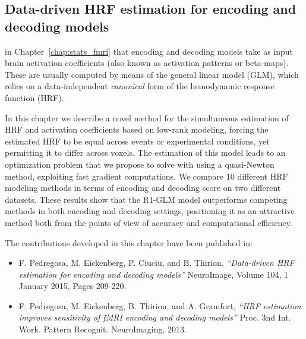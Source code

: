 \begin{fullwidth}
\chapter{Data-driven HRF estimation for encoding and \\ \mbox{decoding} models}\label{chap:hrf_estimation}
\end{fullwidth}


 in Chapter~\ref{chap:stats_fmri} that encoding and decoding models take as input  brain activation coefficients (also known as activation patterns or beta-maps). These are usually computed by means of the general linear model (GLM), which
relies on a \mbox{data-independent} \emph{canonical} form of the hemodynamic response function
(HRF).


In this chapter we describe a novel method for the simultaneous estimation of HRF and activation coefficients based on low-rank modeling, forcing the estimated HRF to be equal across events or experimental conditions,
 yet permitting it to differ across voxels. The estimation of this model leads to
an optimization problem that we propose to solve with using a
\mbox{quasi-Newton} method, exploiting fast gradient computations. 
We compare 10 different HRF modeling methods in terms of encoding and decoding
score on two different datasets. These results show that the \mbox{R1-GLM} model
outperforms competing methods in both encoding and decoding
settings, positioning it as an attractive method both from the points of view
of accuracy and computational efficiency.

\hspace{20pt}
\begin{shaded}
The contributions developed in this chapter have been published in:
\begin{itemize}
\item F. Pedregosa, M. Eickenberg, P. Ciuciu, and B. Thirion, \emph{``Data-driven HRF estimation for encoding and decoding models''} NeuroImage, Volume 104, 1 January 2015, Pages 209-220.

\item F. Pedregosa, M. Eickenberg, B. Thirion, and A. Gramfort, \emph{“HRF estimation improves sensitivity of fMRI encoding and decoding models”} Proc. 3nd Int. Work. Pattern Recognit. NeuroImaging, 2013.
\end{itemize}
\end{shaded}

